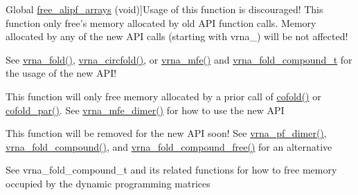 \begin{DoxyRefList}
\hypertarget{deprecated__deprecated000022}{}%
Global \hyperlink{group__consensus__pf__fold_ga0c0498f35686e26b38ee460d3db1a661}{free\-\_\-alipf\-\_\-arrays} (void)]Usage of this function is discouraged! This function only free's memory allocated by old A\-P\-I function calls. Memory allocated by any of the new A\-P\-I calls (starting with vrna\-\_\-) will be not affected! 
\item[\label{deprecated__deprecated000066}%
\hypertarget{deprecated__deprecated000066}{}%
Global \hyperlink{group__mfe__fold__single_ga107fdfe5fd641868156bfd849f6866c7}{free\-\_\-arrays} (void)]See \hyperlink{group__mfe__fold__single_gae7ca49ffb3086f145da36c964a7cec64}{vrna\-\_\-fold()}, \hyperlink{group__mfe__fold__single_gaa0f5bf321038f404b36a6147bdae4154}{vrna\-\_\-circfold()}, or \hyperlink{group__mfe__fold_gabd3b147371ccf25c577f88bbbaf159fd}{vrna\-\_\-mfe()} and \hyperlink{group__fold__compound_ga1b0cef17fd40466cef5968eaeeff6166}{vrna\-\_\-fold\-\_\-compound\-\_\-t} for the usage of the new A\-P\-I! 
\item[\label{deprecated__deprecated000032}%
\hypertarget{deprecated__deprecated000032}{}%
Global \hyperlink{group__mfe__cofold_gaafb33d7473eb9af9d1b168ca8761c41a}{free\-\_\-co\-\_\-arrays} (void)]This function will only free memory allocated by a prior call of \hyperlink{group__mfe__cofold_gabc8517f22cfe70595ee81fc837910d52}{cofold()} or \hyperlink{group__mfe__cofold_ga7612cfeeb1b793f1e4179b1eb53df1f3}{cofold\-\_\-par()}. See \hyperlink{group__mfe__cofold_gaab22d10c1190f205f16a77cab9d5d3ee}{vrna\-\_\-mfe\-\_\-dimer()} for how to use the new A\-P\-I 
\item[\label{deprecated__deprecated000116}%
\hypertarget{deprecated__deprecated000116}{}%
Global \hyperlink{part__func__co_8h_ade3ce34ae8214811374b1d28a40dc247}{free\-\_\-co\-\_\-pf\-\_\-arrays} (void)]This function will be removed for the new A\-P\-I soon! See \hyperlink{group__pf__cofold_ga4e5c7d06c302a7c59fc0d64dc142ca63}{vrna\-\_\-pf\-\_\-dimer()}, \hyperlink{group__fold__compound_ga6601d994ba32b11511b36f68b08403be}{vrna\-\_\-fold\-\_\-compound()}, and \hyperlink{group__fold__compound_gadded6039d63f5d6509836e20321534ad}{vrna\-\_\-fold\-\_\-compound\-\_\-free()} for an alternative  
\item[\label{deprecated__deprecated000097}%
\hypertarget{deprecated__deprecated000097}{}%
Global \hyperlink{group__pf__fold_gae73db3f49a94f0f72e067ecd12681dbd}{free\-\_\-pf\-\_\-arrays} (void)]See vrna\-\_\-fold\-\_\-compound\-\_\-t and its related functions for how to free memory occupied by the dynamic programming matrices 

\end{DoxyRefList}
